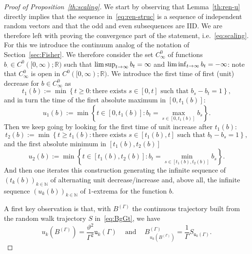 \documentclass[10pt]{amsart}
\theoremstyle{definition}\newtheorem{defi}[theo]{Definition}\newtheorem{rema}[theo]{Remark}\newtheorem{exam}[theo]{Example}\newtheorem{exem}[theo]{Example}\newtheorem{nota}[theo]{Notation}
\newcommand{\bbN}{\mathbb{N}}
\newcommand{\bbR}{\mathbb{R}}
\newcommand{\gG}{\Gamma}
\renewcommand*\ss{\mathtt{u}}
\renewcommand*{\to}{\mathchoice{\longrightarrow}{\rightarrow}{\rightarrow}{\rightarrow}}
\begin{document}
\begin{proof}[Proof of Proposition~\ref{th:scaling}]
We start by observing that Lemma~\ref{th:ren-u} directly implies that the sequence in~\eqref{eq:ren-struc} is a sequence of independent random vectors and that the odd and even subsequences are IID. We are therefore left with proving the convergence part of the statement, i.e.~\eqref{eq:scaling}. For this we introduce the continuum analog of the notation of Section~\ref{sec:Fisher}. We therefore consider the set $C^0_\infty$ of functions $b_\cdot \in C^0([0, \infty); \bbR)$ such that $\limsup_{t\to \infty} b_t=\infty$ and $\liminf_{t\to \infty} b_t=-\infty$: note that $C^0_\infty$ is open in $C^0([0, \infty); \bbR)$. We introduce the first time of first (unit) decrease for $b\in C^0_\infty$ as
\begin{equation}
t_1(b) := \min\left\{t\ge 0: \text{there exists } s \in [0,t] \text{ such that } b_s-b_t=1\right\},
\end{equation}
and in turn the time of the first absolute maximum in $[0, t_1(b)]$:
\begin{equation}
u_1(b):= \min\left \{t \in [0, t_1(b)]: b_t= \max_{s \in [0, t_1(b)]} b_s \right\}.
\end{equation}
Then we keep going by looking for the first time of unit increase after $t_1(b)$:
\begin{equation}
t_2(b) := \min\left\{t\ge t_1(b): \text{there exists } s \in [t_1(b),t] \text{ such that } b_t-b_s=1\right\},
\end{equation}
and the first absolute minimum in $[t_1(b), t_2(b)]$
\begin{equation}
u_2(b):= \min\left \{t \in [t_1(b), t_2(b)]: b_t= \min_{s \in [t_1(b), t_2(b)]} b_s \right\}.
\end{equation}
And then one iterates this construction generating the infinite sequence of $(t_k(b))_{k \in \bbN}$ of alternating unit decrease/increase and, above all, the infinite sequence $(u_k(b))_{k \in \bbN}$ of $1$-extrema for the function $b$.

A first key observation is that, with $B^{(\gG)}$ the continuous trajectory built from the random walk trajectory $S$ in~\eqref{eq:BgGt}, we have
\begin{equation}
u_k \left(B^{(\gG)}\right) = \frac{\vartheta^2}{\gG^2} \ss_k(\gG)
\ \quad\text{and}\quad \ B^{(\gG)}_{u_k \left(B^{(\gG)} \right)}=
\frac 1 \gG S_{\ss_k(\gG)}.
\end{equation}


\end{proof}
\end{document}
